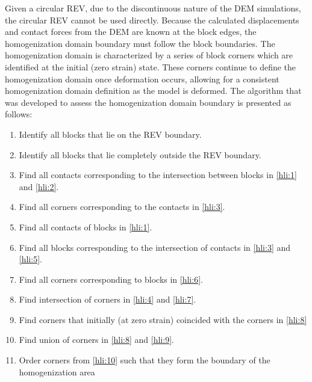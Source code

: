 Given a circular REV, due to the discontinuous nature of the DEM simulations, the circular REV cannot be used directly. Because the calculated displacements and contact forces from the DEM are known at the block edges, the homogenization domain boundary must follow the block boundaries. The homogenization domain is characterized by a series of block corners which are identified at the initial (zero strain) state. These corners continue to define the homogenization domain once deformation occurs, allowing for a consistent homogenization domain definition as the model is deformed. The algorithm that was developed to assess the homogenization domain boundary is presented as follows: 

\begin{enumerate}
\item \label{hli:1} Identify all blocks that lie on the REV boundary. 
\item \label{hli:2} Identify all blocks that lie completely outside the
REV boundary. 
\item \label{hli:3} Find all contacts corresponding to the intersection
between blocks in \ref{hli:1} and \ref{hli:2}. 
\item \label{hli:4} Find all corners corresponding to the contacts in \ref{hli:3}. 
\item \label{hli:5} Find all contacts of blocks in \ref{hli:1}. 
\item \label{hli:6} Find all blocks corresponding to the intersection of
contacts in \ref{hli:3} and \ref{hli:5}. 
\item \label{hli:7} Find all corners corresponding to blocks in \ref{hli:6}. 
\item \label{hli:8} Find intersection of corners in \ref{hli:4} and \ref{hli:7}. 
\item \label{hli:9} Find corners that initially (at zero strain) coincided
with the corners in \ref{hli:8} 
\item \label{hli:10} Find union of corners in \ref{hli:8} and \ref{hli:9}. 
\item \label{hli:11} Order corners from \ref{hli:10} such that they form
the boundary of the homogenization area
\end{enumerate}

